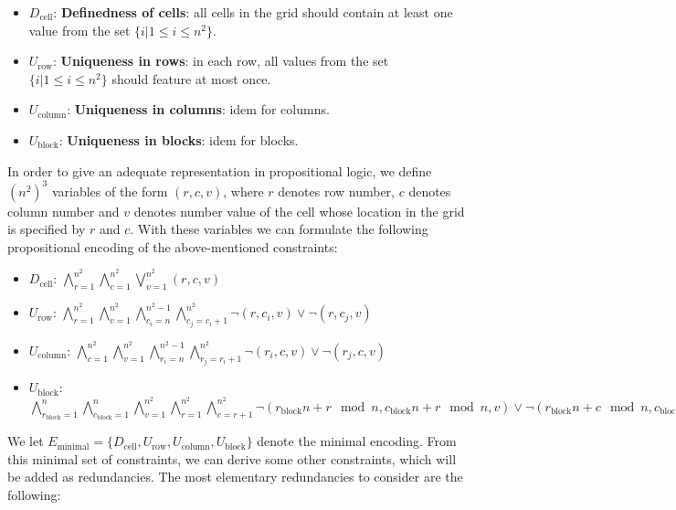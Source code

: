 \documentclass[10pt,a4paper,leqno]{article}
\newcommand{\dcell}{D_{\text{cell}}}
\newcommand{\urow}{U_{\text{row}}}
\newcommand{\ucol}{U_{\text{column}}}
\newcommand{\ublock}{U_{\text{block}}}
\begin{document}
\begin{itemize}

\item $\dcell$: \textbf{Definedness of cells}: all cells in the grid should contain at least one value from the set $\{i | 1 \leq i \leq n^2\}$.

\item $\urow$: \textbf{Uniqueness in rows}: in each row, all values from the set $\{i | 1 \leq i \leq n^2\}$ should feature at most once. 

\item $\ucol$: \textbf{Uniqueness in columns}: idem for columns. 

\item $\ublock$: \textbf{Uniqueness in blocks}: idem for blocks. 

\end{itemize}

In order to give an adequate representation in propositional logic, we define $(n^2)^3$ variables of the form $(r,c,v)$, where $r$ denotes row number, $c$ denotes column number and $v$ denotes number value of the cell whose location in the grid is specified by $r$ and $c$. With these variables we can formulate the following propositional encoding of the above-mentioned constraints:  

\begin{itemize}

\item $\dcell$: 
$\bigwedge_{r=1}^{n^2} \bigwedge_{c=1}^{n^2} \bigvee_{v=1}^{n^2} (r,c,v)$

\item $\urow$:
$\bigwedge_{r=1}^{n^2} \bigwedge_{v=1}^{n^2}\bigwedge_{c_i=n}^{n^2 - 1} \bigwedge_{c_j=c_i+1}^{n^2} \neg(r,c_i,v) \lor \neg(r,c_j,v)$


\item $\ucol$: 
$\bigwedge_{c=1}^{n^2} \bigwedge_{v=1}^{n^2}\bigwedge_{r_i=n}^{n^2-1} \bigwedge_{r_j=r_i+1}^{n^2} \neg(r_i,c,v) \lor \neg(r_j,c,v)$


\item $\ublock$:  
$\bigwedge_{r_{\text{block}} = 1}^{n} \bigwedge_{c_{\text{block}} = 1}^{n}\bigwedge_{v=1}^{n^2} \bigwedge_{r = 1}^{n^2} \bigwedge_{c = r + 1}^{n^2} \neg(r_{\text{block}} n + r \mod n,c_{\text{block}} n + r \mod n,v) \lor \neg(r_{\text{block}} n + c \mod n,c_{\text{block}} n + c \mod n,v)$

\end{itemize}

We let $E_{\text{minimal}} = \{\dcell,\urow,\ucol,\ublock\}$ denote the minimal encoding. From this minimal set of constraints, we can derive some other constraints, which will be added as redundancies. The most elementary redundancies to consider are the following: 
\end{document}
